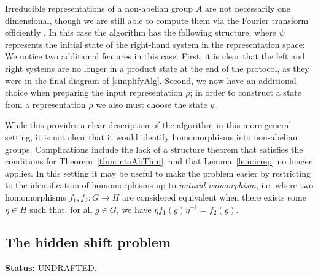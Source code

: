 Irreducible representations of a non-abelian group $A$ are not necessarily one dimensional, though we are still able to compute them via the Fourier transform efficiently \cite{childs2010quantum}. In this case the algorithm has the following structure, where $\psi$ represents the initial state of the right-hand system in the representation space:
\begin{equation}
\label{eq:NonAbAlg}

\end{equation}
We notice two additional features in this case. First, it is clear that the left and right systems are no longer in a product state at the end of the protocol, as they were in the final diagram of \eqref{simplifyAlg}. Second, we now have an additional choice when preparing the input representation $\rho$; in order to construct a state from a representation $\rho$ we also must choose the state $\psi$.

While this provides a clear description of the algorithm in this more general setting, it is not clear that it would identify homomorphisms into non-abelian groups. Complications include the lack of a structure theorem that satisfies the conditions for Theorem~\ref{thm:intoAbThm}, and that Lemma~\ref{lem:irrep} no longer applies.  In this setting it may be useful to make the problem easier by restricting to the identification of homomorphisms up to \emph{natural isomorphism}, i.e. where two homomorphisms $f_1,f_2:G\to H$ are considered equivalent when there exists some $\eta\in H$ such that, for all $g\in G$, we have $\eta f_1(g) \eta^{-1} = f_2(g)$.

\subsection{\color{blue} The hidden shift problem}
{\bf Status:} UNDRAFTED.

